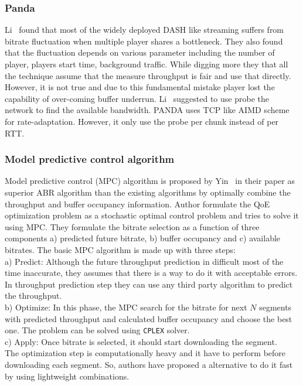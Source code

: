 \subsubsection{Panda\cite{140405}}
Li \etal\ found that most of the widely deployed DASH like streaming suffers from bitrate fluctuation when multiple player shares a bottleneck. They also found that the fluctuation depends on various parameter including the number of player, players start time, background traffic. While digging more they that all the technique assume that the measure throughput is fair and use that directly. However, it is not true and due to this fundamental mistake player lost the capability of over-coming buffer underrun. Li \etal\ suggested to use probe the network to find the available bandwidth. PANDA uses TCP like AIMD scheme for rate-adaptation. However, it only use the probe per chunk instead of per RTT.

\subsubsection{Model predictive control algorithm\cite{10.1145/2785956.2787486,10.1145/2670518.2673877}}
Model predictive control (MPC) algorithm is proposed by Yin \etal\ in their paper \cite{10.1145/2785956.2787486,10.1145/2670518.2673877} as superior ABR algorithm than the existing algorithms by optimally combine the throughput and buffer occupancy information. Author formulate the QoE optimization problem as a stochastic optimal control problem and tries to solve it using MPC. They formulate the bitrate selection as a function of three components a) predicted future bitrate, b) buffer occupancy and c) available bitrates. The basic MPC algorithm is made up with three steps: \\
a) Predict: Although the future throughput prediction in difficult most of the time inaccurate, they assumes that there is a way to do it with acceptable errors. In throughput prediction step they can use any third party algorithm to predict the throughput.\\
b) Optimize: In this phase, the MPC search for the bitrate for next $N$ segments with predicted throughput and calculated buffer occupancy and choose the best one. The problem can be solved using {\tt CPLEX} solver.\\
c) Apply: Once bitrate is selected, it should start downloading the segment.\\
The optimization step is computationally heavy and it have to perform before downloading each segment. So, authors have proposed a alternative to do it fast by using lightweight combinations.

